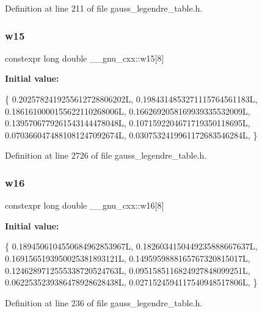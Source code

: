 Definition at line 211 of file gauss\+\_\+legendre\+\_\+table.\+h.

\mbox{\label{namespace____gnu__cxx_ab3e1c2f759eb0240f8cd080176d2b368}} 
\subsubsection{\texorpdfstring{w15}{w15}}
{\footnotesize\ttfamily constexpr long double \+\_\+\+\_\+gnu\+\_\+cxx\+::w15\mbox{[}8\mbox{]}}

{\bfseries Initial value\+:}
\begin{DoxyCode}
\{
    0.2025782419255612728806202L,
    0.1984314853271115764561183L,
    0.1861610000155622110268006L,
    0.1662692058169939335532009L,
    0.1395706779261543144478048L,
    0.1071592204671719350118695L,
    0.0703660474881081247092674L,
    0.0307532419961172683546284L,
  \}
\end{DoxyCode}


Definition at line 2726 of file gauss\+\_\+legendre\+\_\+table.\+h.

\mbox{\label{namespace____gnu__cxx_a8ed7eb855a47e600a4fcf95a7fe50017}} 
\subsubsection{\texorpdfstring{w16}{w16}}
{\footnotesize\ttfamily constexpr long double \+\_\+\+\_\+gnu\+\_\+cxx\+::w16\mbox{[}8\mbox{]}}

{\bfseries Initial value\+:}
\begin{DoxyCode}
\{
    0.1894506104550684962853967L,
    0.1826034150449235888667637L,
    0.1691565193950025381893121L,
    0.1495959888165767320815017L,
    0.1246289712555338720524763L,
    0.0951585116824927848099251L,
    0.0622535239386478928628438L,
    0.0271524594117540948517806L,
  \}
\end{DoxyCode}


Definition at line 236 of file gauss\+\_\+legendre\+\_\+table.\+h.

\mbox{\label{namespace____gnu__cxx_ae9200716f406eb77f0a164d8a525f768}} 
